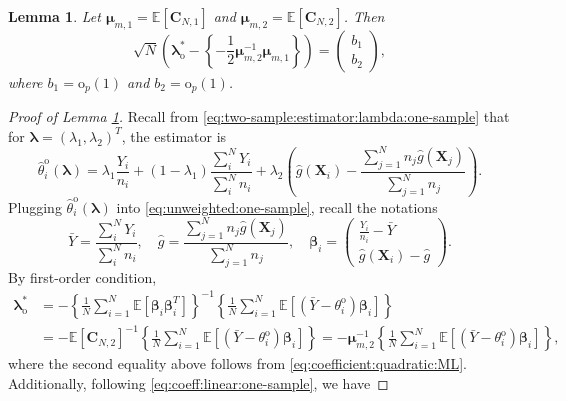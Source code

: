 \documentclass[12pt,letterpaper]{article}
\newtheorem{lemma}{Lemma}[section]
\begin{document}
\begin{lemma}\label{lemma:bias:lambda:one-sample}
Let  $\boldsymbol{\mu}_{m,1}=\mathbb{E}[\mathbf{C}_{N,1}]$ and $\boldsymbol{\mu}_{m,2}=\mathbb{E}[\mathbf{C}_{N,2}]$. Then    $$\sqrt{N}\left(\boldsymbol{\lambda}_{\mathrm{o}}^*-\left\{-\frac{1}{2}\boldsymbol{\mu}_{m,2}^{-1}\boldsymbol{\mu}_{m,1}\right\}\right)=\begin{pmatrix}
    b_1\\
    b_2
\end{pmatrix},$$
where $b_1=\mathrm{o}_p(1)$ and $b_2=\mathrm{o}_p(1)$. 
\end{lemma}
\begin{proof}[Proof of Lemma \ref{lemma:bias:lambda:one-sample}]
Recall from \eqref{eq:two-sample:estimator:lambda:one-sample} that for $\boldsymbol{\lambda}=(\lambda_1,\lambda_2)^T$, the estimator is 
$$\hat{\theta}_i^{\mathrm{o}}(\boldsymbol{\lambda}) = \lambda_1\frac{Y_i}{n_i} + (1-\lambda_1)\frac{\sum_{i}^{N}Y_i}{\sum_{i}^{N}n_i}+\lambda_2\left(\hat{g}(\mathbf{X}_i)-\frac{\sum_{j=1}^Nn_j\hat{g}(\mathbf{X}_{j})}{\sum_{j=1}^Nn_j}\right).$$
Plugging $\hat{\theta}_i^{\mathrm{o}}(\boldsymbol{\lambda})$ into \eqref{eq:unweighted:one-sample}, recall the notations 
$$\bar{Y}=\frac{\sum_{i}^{N}Y_i}{\sum_{i}^{N}n_i},\quad\hat{g}=\frac{\sum_{j=1}^Nn_j\hat{g}(\mathbf{X}_{j})}{\sum_{j=1}^Nn_j},\quad \boldsymbol{\beta}_i=\begin{pmatrix}
\displaystyle \frac{Y_i}{n_i}-\bar{Y}\\
\displaystyle \hat{g}(\mathbf{X}_i)-\hat{g}
\end{pmatrix}.$$ 
By first-order condition, 
\begin{equation}\label{eq:lambda:star:one-sample}
\begin{array}{rl}
\boldsymbol{\lambda}_{\mathrm{o}}^*\!\!\!&\displaystyle=-\left\{\frac{1}{N}\sum_{i=1}^N\mathbb{E}\left[\boldsymbol{\beta}_i\boldsymbol{\beta}_i^T\right]\right\}^{-1}\left\{\frac{1}{N}\sum_{i=1}^N\mathbb{E}\left[\left(\bar{Y}-\theta_i^{\mathrm{o}}\right)\boldsymbol{\beta}_i\right]\right\}\\
&\displaystyle=-\mathbb{E}[\mathbf{C}_{N,2}]^{-1}\left\{\frac{1}{N}\sum_{i=1}^N\mathbb{E}\left[\left(\bar{Y}-\theta_i^{\mathrm{o}}\right)\boldsymbol{\beta}_i\right]\right\}=-\boldsymbol{\mu}_{m,2}^{-1}\left\{\frac{1}{N}\sum_{i=1}^N\mathbb{E}\left[\left(\bar{Y}-\theta_i^{\mathrm{o}}\right)\boldsymbol{\beta}_i\right]\right\},
\end{array}
\end{equation}
where the second equality above follows from \eqref{eq:coefficient:quadratic:ML}. Additionally, following \eqref{eq:coeff:linear:one-sample}, we have 

\end{proof}
\end{document}
